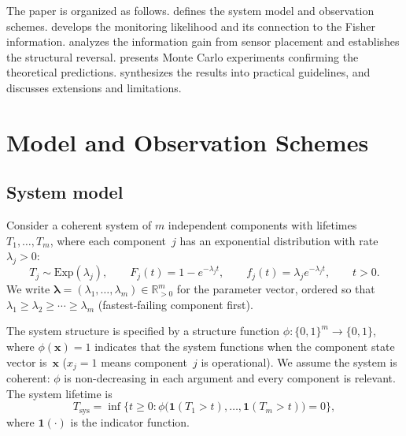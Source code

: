 \documentclass[12pt]{article}
\theoremstyle{definition}
\theoremstyle{remark}
\newcommand{\Rset}{\mathbb{R}}
\newcommand{\bone}{\mathbf{1}}
\newcommand{\blam}{\boldsymbol{\lambda}}
\begin{document}
The paper is organized as follows.   defines the
system model and observation schemes.   develops
the monitoring likelihood and its connection to the Fisher information.
 analyzes the information gain from sensor
placement and establishes the structural reversal.
 presents Monte Carlo experiments confirming the
theoretical predictions.   synthesizes the
results into practical guidelines, and  discusses
extensions and limitations.


\section{Model and Observation Schemes}
\label{sec:model}

\subsection{System model}
\label{sec:system-model}

Consider a coherent system of $m$ independent components with
lifetimes $T_1, \ldots, T_m$, where each component~$j$ has an
exponential distribution with rate $\lambda_j > 0$:
\begin{equation}\label{eq:comp-dist}
  T_j \sim \mathrm{Exp}(\lambda_j), \qquad
  F_j(t) = 1 - e^{-\lambda_j t}, \qquad
  f_j(t) = \lambda_j e^{-\lambda_j t}, \qquad t > 0.
\end{equation}
We write $\blam = (\lambda_1, \ldots, \lambda_m) \in \Rset_{>0}^m$
for the parameter vector, ordered so that
$\lambda_1 \geq \lambda_2 \geq \cdots \geq \lambda_m$
(fastest-failing component first).

The system structure is specified by a structure function
$\phi\colon \{0,1\}^m \to \{0,1\}$, where $\phi(\mathbf{x}) = 1$
indicates that the system functions when the component state vector
is~$\mathbf{x}$ ($x_j = 1$ means component~$j$ is operational).  We
assume the system is coherent: $\phi$ is non-decreasing in each
argument and every component is relevant.  The system lifetime is
\begin{equation}\label{eq:sys-lifetime}
  T_{\mathrm{sys}} = \inf\{t \geq 0 : \phi\bigl(\bone(T_1 > t), \ldots, \bone(T_m > t)\bigr) = 0\},
\end{equation}
where $\bone(\cdot)$ is the indicator function.
\end{document}
